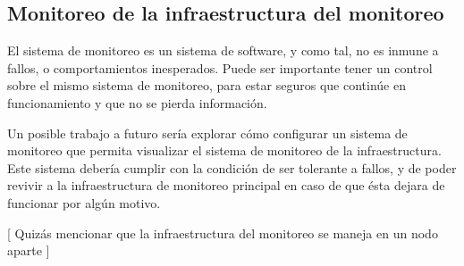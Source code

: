 \subsection{Monitoreo de la infraestructura del monitoreo}
\label{del-monitoreo}

El sistema de monitoreo es un sistema de software, y como tal, no es inmune a
fallos,  o comportamientos inesperados. Puede ser importante tener un
control sobre el mismo sistema de monitoreo, para estar seguros que continúe en
funcionamiento y que no se pierda información.

Un posible trabajo a futuro sería explorar cómo configurar un sistema de
monitoreo que permita visualizar el sistema de monitoreo de la infraestructura.
Este sistema debería cumplir con la condición de ser tolerante a fallos, y de
poder revivir a la infraestructura de monitoreo principal en caso de que ésta
dejara de funcionar por algún motivo.

[ Quizás mencionar que la infraestructura del monitoreo se maneja en un nodo aparte ]
